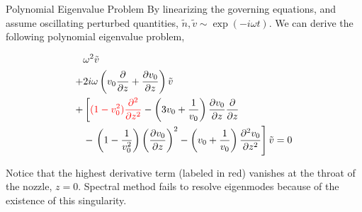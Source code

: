 \begin{frame}{Polynomial Eigenvalue Problem}
  By linearizing the governing equations, and assume oscillating perturbed quantities, $\tilde{n}, \tilde{v} \sim \exp(-i\omega t)$. We can derive the following polynomial eigenvalue problem,

  \begin{equation}
    \begin{aligned}
        & \omega^2 \tilde{v}                                                 \\
      + & 2i\omega\left(v_0\pdv{}{z} + \pdv{v_0}{z}\right) \tilde{v}         \\
      + & \left[ \textcolor{red}{(1-v_0^2)\pdv[2]{}{z}}
      -\left(3v_0 + \frac{1}{v_0}\right)\pdv{v_0}{z}\pdv{}{z} \right.        \\
        & - \left. \left(1-\frac{1}{v_0^2}\right)\left(\pdv{v_0}{z}\right)^2
        - \left(v_0+\frac{1}{v_0}\right)\pdv[2]{v_0}{z} \right]\tilde{v}
      = 0
    \end{aligned}
    \label{eq:polynomial_eigenvalue_problem}
  \end{equation}

  Notice that the highest derivative term (labeled in red) vanishes at the throat of the nozzle, $z=0$. Spectral method fails to resolve eigenmodes because of the existence of this singularity.
\end{frame}
